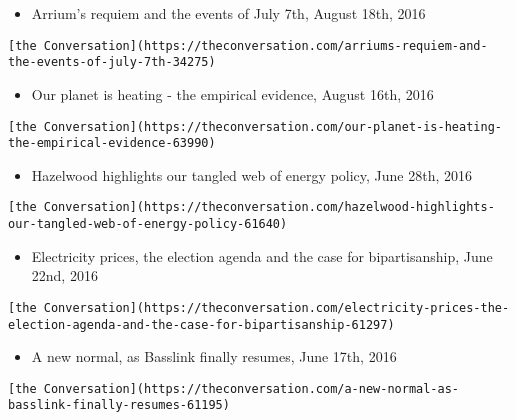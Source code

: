 \documentclass[
]{article}
\providecommand{\tightlist}{%
  \setlength{\itemsep}{0pt}\setlength{\parskip}{0pt}}
\begin{document}
\begin{itemize}
\tightlist
\item
  Arrium's requiem and the events of July 7th, August 18th, 2016
\end{itemize}

\begin{verbatim}
[the Conversation](https://theconversation.com/arriums-requiem-and-the-events-of-july-7th-34275)
\end{verbatim}

\begin{itemize}
\tightlist
\item
  Our planet is heating - the empirical evidence, August 16th, 2016
\end{itemize}

\begin{verbatim}
[the Conversation](https://theconversation.com/our-planet-is-heating-the-empirical-evidence-63990)
\end{verbatim}

\begin{itemize}
\tightlist
\item
  Hazelwood highlights our tangled web of energy policy, June 28th, 2016
\end{itemize}

\begin{verbatim}
[the Conversation](https://theconversation.com/hazelwood-highlights-our-tangled-web-of-energy-policy-61640)
\end{verbatim}

\begin{itemize}
\tightlist
\item
  Electricity prices, the election agenda and the case for
  bipartisanship, June 22nd, 2016
\end{itemize}

\begin{verbatim}
[the Conversation](https://theconversation.com/electricity-prices-the-election-agenda-and-the-case-for-bipartisanship-61297)
\end{verbatim}

\begin{itemize}
\tightlist
\item
  A new normal, as Basslink finally resumes, June 17th, 2016
\end{itemize}

\begin{verbatim}
[the Conversation](https://theconversation.com/a-new-normal-as-basslink-finally-resumes-61195)
\end{verbatim}
\end{document}
